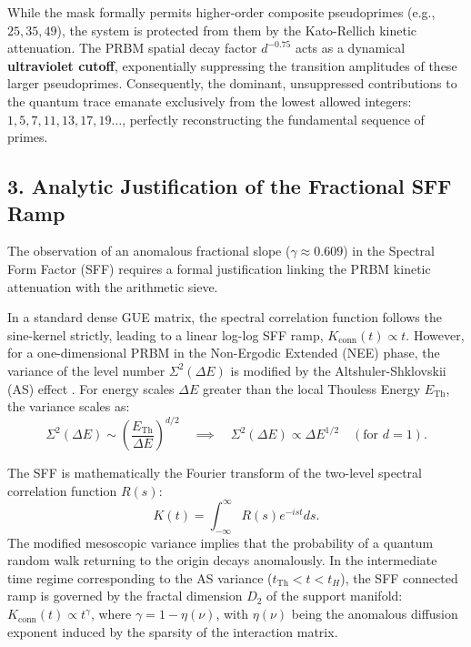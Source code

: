 \documentclass[aps,prl,preprint,superscriptaddress,floatfix]{revtex4-2}
\begin{document}
While the mask formally permits higher-order composite pseudoprimes (e.g., $25, 35, 49$), the system is protected from them by the Kato-Rellich kinetic attenuation. The PRBM spatial decay factor $d^{-0.75}$ acts as a dynamical \textbf{ultraviolet cutoff}, exponentially suppressing the transition amplitudes of these larger pseudoprimes. Consequently, the dominant, unsuppressed contributions to the quantum trace emanate exclusively from the lowest allowed integers: $1, 5, 7, 11, 13, 17, 19\dots$, perfectly reconstructing the fundamental sequence of primes.

\subsection{3. Analytic Justification of the Fractional SFF Ramp}
The observation of an anomalous fractional slope ($\gamma \approx 0.609$) in the Spectral Form Factor (SFF) requires a formal justification linking the PRBM kinetic attenuation with the arithmetic sieve. 

In a standard dense GUE matrix, the spectral correlation function follows the sine-kernel strictly, leading to a linear log-log SFF ramp, $K_{\text{conn}}(t) \propto t$. However, for a one-dimensional PRBM in the Non-Ergodic Extended (NEE) phase, the variance of the level number $\Sigma^2(\Delta E)$ is modified by the Altshuler-Shklovskii (AS) effect \cite{Erdos2013, Erdos2015}. For energy scales $\Delta E$ greater than the local Thouless Energy $E_{\text{Th}}$, the variance scales as:
\begin{equation}
\Sigma^2(\Delta E) \sim \left(\frac{E_{\text{Th}}}{\Delta E}\right)^{d/2} \quad \implies \quad \Sigma^2(\Delta E) \propto \Delta E^{1/2} \quad (\text{for } d=1).
\end{equation}

The SFF is mathematically the Fourier transform of the two-level spectral correlation function $R(s)$:
\begin{equation}
K(t) = \int_{-\infty}^{\infty} R(s) e^{-ist} ds.
\end{equation}
The modified mesoscopic variance implies that the probability of a quantum random walk returning to the origin decays anomalously. In the intermediate time regime corresponding to the AS variance ($t_{\text{Th}} < t < t_H$), the SFF connected ramp is governed by the fractal dimension $D_2$ of the support manifold: $K_{\text{conn}}(t) \propto t^{\gamma}$, where $\gamma = 1 - \eta(\nu)$, with $\eta(\nu)$ being the anomalous diffusion exponent induced by the sparsity of the interaction matrix. 
\end{document}
